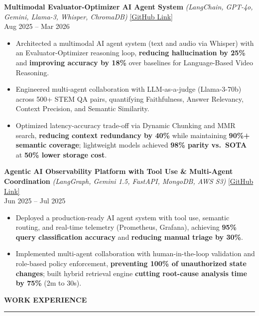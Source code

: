 \documentclass[letterpaper,10.5pt]{extarticle}
\newcommand{\resumesection}[1]{%
    \vspace{6pt}%
    \noindent\textbf{#1}\vspace{-5pt}%
    \\\noindent\rule{\textwidth}{0.5pt}%
    \vspace{1pt}%
}
\begin{document}
\noindent\textbf{Multimodal Evaluator-Optimizer AI Agent System}
\textit{(LangChain, GPT-4o, Gemini, Llama-3, Whisper, ChromaDB)} \hfill \href{https://github.com/slowloris-98/Evaluator-Optimizer-RAG}{[GitHub Link]}\\
Aug 2025 -- Mar 2026

\begin{itemize}[leftmargin=12pt, topsep=1pt, itemsep=0pt, parsep=0pt]
    \item Architected a multimodal AI agent system (text and audio via Whisper) with an Evaluator-Optimizer reasoning loop, \textbf{reducing hallucination by 25\%} and \textbf{improving accuracy by 18\%} over baselines for Language-Based Video Reasoning.
    \item Engineered multi-agent collaboration with LLM-as-a-judge (Llama-3-70b) across 500+ STEM QA pairs, quantifying Faithfulness, Answer Relevancy, Context Precision, and Semantic Similarity.
    \item Optimized latency-accuracy trade-off via Dynamic Chunking and MMR search, \textbf{reducing context redundancy by 40\%} while maintaining \textbf{90\%+ semantic coverage}; lightweight models achieved \textbf{98\% parity vs.\ SOTA} at \textbf{50\% lower storage cost}.
\end{itemize}

\vspace{2pt}

\noindent\textbf{Agentic AI Observability Platform with Tool Use \& Multi-Agent Coordination}
\textit{(LangGraph, Gemini 1.5, FastAPI, MongoDB, AWS S3)} \hfill \href{https://github.com/slowloris-98/Agentic-Oberservability-BMC}{[GitHub Link]}\\
Jun 2025 -- Jul 2025

\begin{itemize}[leftmargin=12pt, topsep=1pt, itemsep=0pt, parsep=0pt]
    \item Deployed a production-ready AI agent system with tool use, semantic routing, and real-time telemetry (Prometheus, Grafana), achieving \textbf{95\% query classification accuracy} and \textbf{reducing manual triage by 30\%}.
    \item Implemented multi-agent collaboration with human-in-the-loop validation and role-based policy enforcement, \textbf{preventing 100\% of unauthorized state changes}; built hybrid retrieval engine \textbf{cutting root-cause analysis time by 75\%} (2m to 30s).
\end{itemize}

\resumesection{WORK EXPERIENCE}
\end{document}
